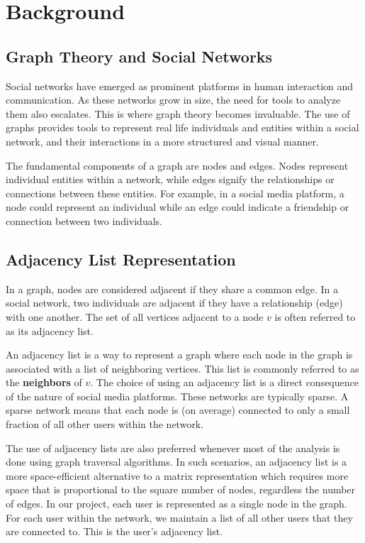 \section*{Background}

\subsection*{Graph Theory and Social Networks}
Social networks have emerged as prominent platforms in human interaction and communication. As these networks grow in size, the need for tools to analyze them also escalates. This is where graph theory becomes invaluable. The use of graphs provides tools to represent real life individuals and entities within a social network, and their interactions in a more structured and visual manner. 

The fundamental components of a graph are nodes and edges. Nodes represent individual entities within a network, while edges signify the relationships or connections between these entities. For example, in a social media platform, a node could represent an individual while an edge could indicate a friendship or connection between two individuals.

\subsection*{Adjacency List Representation}
In a graph, nodes are considered adjacent if they share a common edge. In a social network, two individuals are adjacent if they have a relationship (edge) with one another. The set of all vertices adjacent to a node $v$ is often referred to as its adjacency list. 

An adjacency list is a way to represent a graph where each node in the graph is associated with a list of neighboring vertices. This list is commonly referred to as the \textbf{neighbors} of $v$. The choice of using an adjacency list is a direct consequence of the nature of social media platforms. These networks are typically sparse. A sparse network means that each node is (on average) connected to only a small fraction of all other users within the network. 

The use of adjacency lists are also preferred whenever most of the analysis is done using graph traversal algorithms\cite{HUMMON1990273}. In such scenarios, an adjacency list is a more space-efficient alternative to a matrix representation which requires more space that is proportional to the square number of nodes, regardless the number of edges. In our project, each user is represented as a single node in the graph. For each user within the network, we maintain a list of all other users that they are connected to. This is the user's adjacency list.

